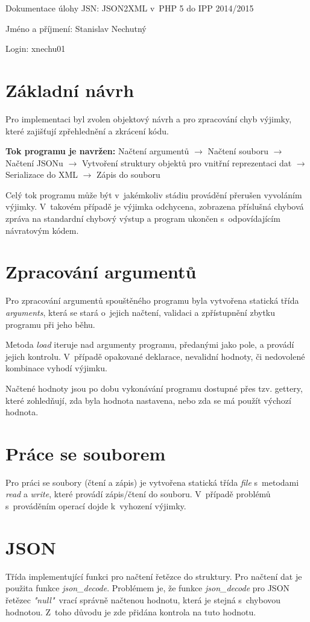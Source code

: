 \documentclass[10pt,a4paper]{article}
\author{Stanislav Nechutný}
\begin{document}
Dokumentace úlohy JSN: JSON2XML v~PHP 5 do IPP 2014/2015

Jméno a příjmení: Stanislav Nechutný

Login: xnechu01

\section{Základní návrh}
	Pro implementaci byl zvolen objektový návrh a pro zpracování chyb výjimky, které zajišťují zpřehlednění a zkrácení kódu.
	
	\textbf{Tok programu je navržen:} Načtení argumentů $\rightarrow$ Načtení souboru $\rightarrow$ Načtení JSONu $\rightarrow$ Vytvoření struktury objektů pro vnitřní reprezentaci dat $\rightarrow$ Serializace do XML $\rightarrow$ Zápis do souboru
	
	Celý tok programu může být v~jakémkoliv stádiu provádění přerušen vyvoláním výjimky. V~takovém případě je výjimka odchycena, zobrazena příslušná chybová zpráva na standardní chybový výstup a program ukončen s~odpovídajícím návratovým kódem.
	
\section{Zpracování argumentů}
	Pro zpracování argumentů spouštěného programu byla vytvořena statická třída \textit{arguments}, která se stará o~jejich načtení, validaci a zpřístupnění zbytku programu při jeho běhu.
	
	Metoda \textit{load} iteruje nad argumenty programu, předanými jako pole, a provádí jejich kontrolu. V~případě opakované deklarace, nevalidní hodnoty, či nedovolené kombinace vyhodí výjimku.
	
	Načtené hodnoty jsou po dobu vykonávání programu dostupné přes tzv. gettery, které zohledňují, zda byla hodnota nastavena, nebo zda se má použít výchozí hodnota.
	
\section{Práce se souborem}
	Pro práci se soubory (čtení a zápis) je vytvořena statická třída \textit{file} s~metodami \textit{read} a \textit{write}, které provádí zápis/čtení do souboru. V~případě problémů s~prováděním operací dojde k~vyhození výjimky.
	
\section{JSON}
	Třída implementující funkci pro načtení řetězce do struktury. Pro načtení dat je použita funkce \textit{json\_decode}. Problémem je, že funkce \textit{json\_decode} pro JSON řetězec \textit{"null"}\ vrací správně načtenou hodnotu, která je stejná s~chybovou hodnotou. Z~toho důvodu je zde přidána kontrola na tuto hodnotu.
	
\end{document}
